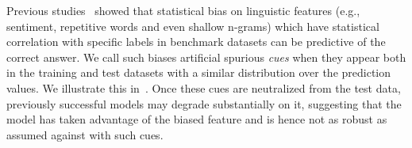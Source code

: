 Previous studies~\cite{gururangan2018annotation,sanchez2018behavior,poliak2018hypothesis} 
showed that statistical bias on linguistic features 
(e.g., sentiment, repetitive words and even shallow n-grams)
which have statistical correlation with specific labels 
in benchmark datasets can be predictive of the correct 
answer. We call such biases artificial spurious \textit{cues} when
they appear both in the training and test datasets with a similar distribution
over the prediction values.
We illustrate this in~. 
Once these cues are neutralized from the test data, 
previously successful models may degrade substantially
on it, suggesting that the model has taken advantage of 
the biased feature and is hence not as robust as assumed 
against with such cues.

%





